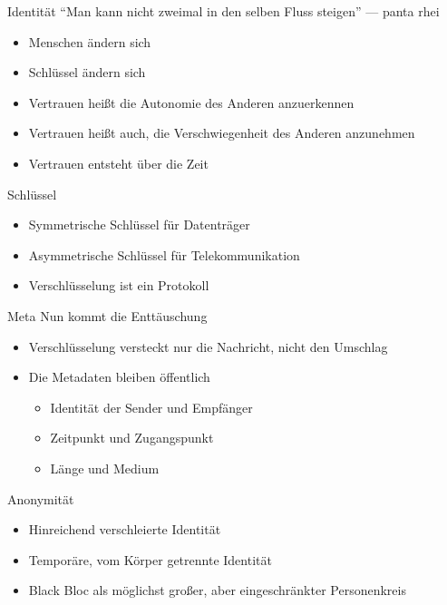 \documentclass[aspectratio=1610]{beamer}
\begin{document}
  \begin{frame}{Identität}
    “Man kann nicht zweimal in den selben Fluss steigen” --- panta rhei
    \begin{itemize}
      \pause
      \item Menschen ändern sich
      \pause
      \item Schlüssel ändern sich
      \pause
      \item Vertrauen heißt die Autonomie des Anderen anzuerkennen
      \pause
      \item Vertrauen heißt auch, die Verschwiegenheit des Anderen anzunehmen
      \pause
      \item Vertrauen entsteht über die Zeit
    \end{itemize}
  \end{frame}

  \begin{frame}{Schlüssel}
    \begin{itemize}
      \pause
      \item Symmetrische Schlüssel für Datenträger
      \pause
      \item Asymmetrische Schlüssel für Telekommunikation
      \pause
      \item Verschlüsselung ist ein Protokoll
    \end{itemize}
  \end{frame}

  \begin{frame}{Meta}
    Nun kommt die Enttäuschung
    \begin{itemize}
      \pause
      \item Verschlüsselung versteckt nur die Nachricht, nicht den Umschlag
      \pause
      \item Die Metadaten bleiben öffentlich
        \begin{itemize}
          \pause
          \item Identität der Sender und Empfänger
          \pause
          \item Zeitpunkt und Zugangspunkt
          \pause
          \item Länge und Medium
        \end{itemize}
    \end{itemize}
  \end{frame}

  \begin{frame}{Anonymität}
    \begin{itemize}
      \pause
      \item Hinreichend verschleierte Identität
      \pause
      \item Temporäre, vom Körper getrennte Identität
      \pause
      \item Black Bloc als möglichst großer, aber eingeschränkter Personenkreis
    \end{itemize}
  \end{frame}
\end{document}

